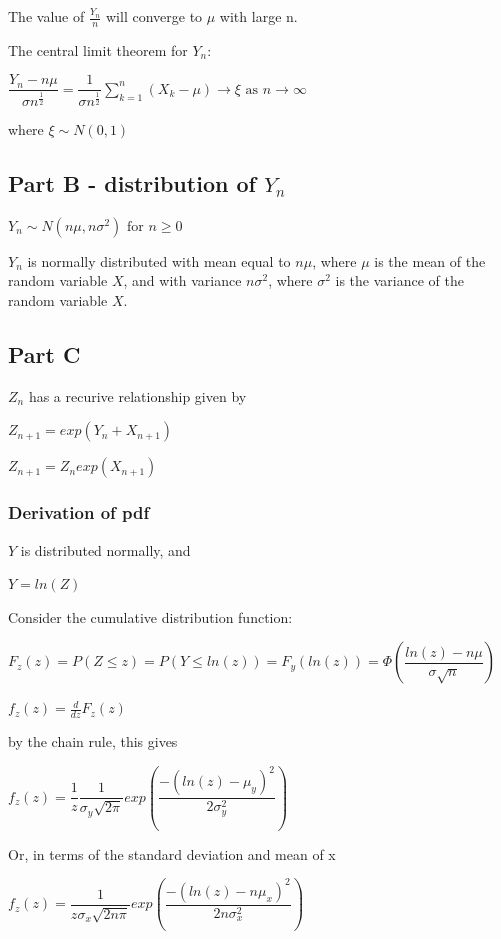 \documentclass{article}
\begin{document}
The value of $\frac{Y_n}{n}$ will converge to $\mu$ with large n.

\bigskip
The central limit theorem for $Y_n$:

$\dfrac{Y_n - n\mu}{\sigma n^\frac{1}{2}} = \dfrac{1}{\sigma n^\frac{1}{2}}\sum\limits_{k=1}^n (X_k - \mu) \to \xi \text{ as } n \to \infty$

where $\xi \sim N(0,1)$

\subsection{Part B - distribution of $Y_n$}

$Y_n \sim N(n\mu, n\sigma^2) \text { for } n \geq 0$

$Y_n$ is normally distributed with mean equal to $n\mu$, where $\mu$ is the mean of the random variable $X$, and with variance $n\sigma^2$, where $\sigma^2$ is the variance of the random variable $X$. 

\subsection{Part C}

$Z_n$ has a recurive relationship given by

$Z_{n+1} = exp(Y_n + X_{n+1})$

$Z_{n+1} = Z_n exp(X_{n+1})$

\subsubsection{Derivation of pdf}

$Y$ is distributed normally, and

$Y = ln(Z)$

\bigskip

Consider the cumulative distribution function:


$F_z(z) = P(Z \leq z) = P(Y \leq ln(z)) = F_y(ln(z)) = \Phi(\dfrac{ln(z) - n\mu}{\sigma \sqrt{n}})$

$f_z(z) = \frac{d}{dz}F_z(z)$

by the chain rule, this gives

$f_z(z) = \dfrac{1}{z} \dfrac{1}{\sigma_y \sqrt{2\pi}}exp(\dfrac{-(ln(z)-\mu_y)^2}{2\sigma_y^2})$

Or, in terms of the standard deviation and mean of x

$f_z(z) = \dfrac{1}{z\sigma_x \sqrt{2n\pi}}exp(\dfrac{-(ln(z)-n\mu_x)^2}{2n\sigma_x^2})$
\end{document}
